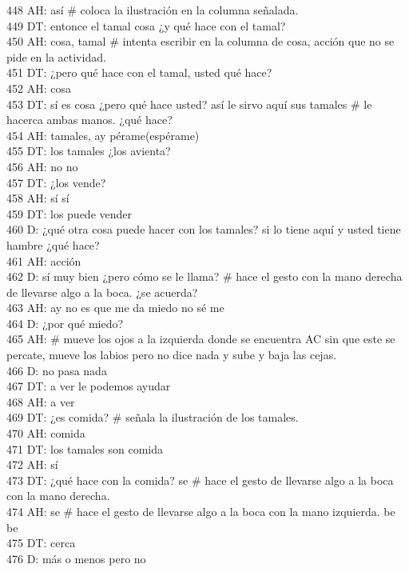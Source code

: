 448 AH: así # coloca la ilustración en la columna señalada.\\
449 DT: entonce el tamal cosa ¿y qué hace con el tamal?\\
450 AH: cosa, tamal \# intenta escribir en la columna de cosa, acción que no se pide en la actividad.\\
451 DT: ¿pero qué hace con el tamal, usted qué hace?\\
452 AH: cosa\\
453 DT: sí es cosa ¿pero qué hace usted? así le sirvo aquí sus tamales \# le hacerca ambas manos. ¿qué hace?\\
454 AH: tamales, ay pérame(espérame)\\
455 DT: los tamales ¿los avienta?\\
456 AH: no no\\
457 DT: ¿los vende?\\
458 AH: sí sí\\
459 DT: los puede vender\\
460 D: ¿qué otra cosa puede hacer con los tamales? si lo tiene aquí y usted tiene hambre ¿qué hace?\\
461 AH: acción\\
462 D: sí muy bien ¿pero cómo se le llama? \# hace el gesto con la mano derecha de llevarse algo a la boca. ¿se acuerda? \\
463 AH: ay no es que me da miedo no sé me \\
464 D: ¿por qué miedo?\\
465 AH: \# mueve los ojos a la izquierda donde se encuentra AC sin que este se percate, mueve los labios pero no dice nada y sube y baja las cejas.\\
466 D: no pasa nada\\
467 DT: a ver le podemos ayudar\\
468 AH: a ver\\
469 DT: ¿es comida? \# señala la ilustración de los tamales.\\
470 AH: comida\\
471 DT: los tamales son comida\\
472 AH: sí\\
473 DT: ¿qué hace con la comida? se \# hace el gesto de llevarse algo a la boca con la mano derecha.\\
474 AH: se \# hace el gesto de llevarse algo a la boca con la mano izquierda. be be\\
475 DT: cerca\\
476 D: más o menos pero no\\
